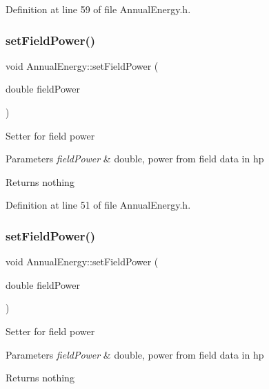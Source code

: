 Definition at line 59 of file Annual\+Energy.\+h.

\mbox{\label{class_annual_energy_a4f7212fcf2f6fcd2b12f36ca26a368a1}} 
\subsubsection{\texorpdfstring{set\+Field\+Power()}{setFieldPower()}\hspace{0.1cm}{\footnotesize\ttfamily [1/3]}}
{\footnotesize\ttfamily void Annual\+Energy\+::set\+Field\+Power (\begin{DoxyParamCaption}\item[{double}]{field\+Power }\end{DoxyParamCaption})\hspace{0.3cm}{\ttfamily [inline]}}

Setter for field power 
\begin{DoxyParams}{Parameters}
{\em field\+Power} & double, power from field data in hp \\
\hline
\end{DoxyParams}
\begin{DoxyReturn}{Returns}
nothing 
\end{DoxyReturn}


Definition at line 51 of file Annual\+Energy.\+h.

\mbox{\label{class_annual_energy_a4f7212fcf2f6fcd2b12f36ca26a368a1}} 
\subsubsection{\texorpdfstring{set\+Field\+Power()}{setFieldPower()}\hspace{0.1cm}{\footnotesize\ttfamily [2/3]}}
{\footnotesize\ttfamily void Annual\+Energy\+::set\+Field\+Power (\begin{DoxyParamCaption}\item[{double}]{field\+Power }\end{DoxyParamCaption})\hspace{0.3cm}{\ttfamily [inline]}}

Setter for field power 
\begin{DoxyParams}{Parameters}
{\em field\+Power} & double, power from field data in hp \\
\hline
\end{DoxyParams}
\begin{DoxyReturn}{Returns}
nothing 
\end{DoxyReturn}


